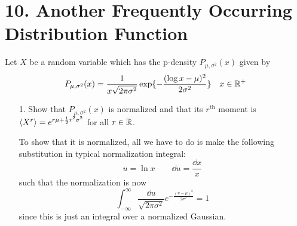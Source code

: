 \documentclass[a4paper,twoside]{article}
\begin{document}
\section*{10. Another Frequently Occurring Distribution Function}
Let $ X $ be a random variable which has the p-density $ P_{\mu, \sigma^2}(x) $ given by
\begin{equation}
    P_{\mu, \sigma^2}(x) = \frac{1}{x \sqrt{2 \pi \sigma^2}}\exp\{- \frac{(\log{x} - \mu)^2}{2 \sigma^2}\} \quad x \in \mathbb{R}^+
\end{equation}
\begin{itemize}
    \item[1.] Show that $ P_{\mu, \sigma^2}(x) $ is normalized and that its $ r^{\text{th}} $ moment is $ \ev{X^r} = e^{r \mu + \frac{1}{2} r^2 \sigma^2} $ for all $ r \in \mathbb{R} $.
        \begin{problem}
            To show that it is normalized, all we have to do is make the following substitution in typical normalization integral:
            \begin{equation}
                u = \ln{x} \qquad \dd{u} = \frac{\dd{x}}{x}
            \end{equation}
            such that the normalization is now
            \begin{equation}
                \int_{- \infty}^{\infty} \frac{\dd{u}}{\sqrt{2 \pi \sigma^2}} e^{- \frac{(u - \mu)^2}{2 \sigma^2}} = 1
            \end{equation}
            since this is just an integral over a normalized Gaussian.


\end{problem}
\end{itemize}
\end{document}
